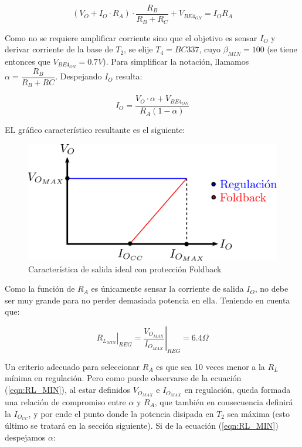 $$(V_O + I_O \cdot R_A)\cdot \frac{R_B}{R_B+R_C} + V_{BE4_{ON}} = I_OR_A$$

Como no se requiere amplificar corriente sino que el objetivo es sensar $I_O$ y derivar corriente de la base de $T_2$, se elije $T_4 = BC337$, cuyo $\beta_{MIN} = 100$ (se tiene entonces que $V_{BE4_{ON}} = 0.7V$). Para simplificar la notaci\'on, llamamos $\alpha = \dfrac{R_B}{R_B+RC}$. Despejando $I_O$ resulta:

\begin{equation}
I_O = \frac{V_O \cdot \alpha + V_{BE4_{ON}}}{R_A(1-\alpha)}
\label{eqn:io_fb}
\end{equation}

EL gr\'afico caracter\'istico resultante es el siguiente:

\begin{figure}[!h]
\begin{centering}
\includegraphics[scale=0.5]{Imagenes/FB_Generico.png}
\par\end{centering}
\caption{Caracter\'istica de salida ideal con protecci\'on Foldback}

\end{figure}

Como la funci\'on de $R_A$ es \'unicamente sensar la corriente de salida $I_O$, no debe ser muy grande para no perder demasiada potencia en ella. Teniendo en cuenta que:

\begin{equation}
\left. R_{L_{MIN}} \right|_{REG} = \left. \frac{V_{O_{MAX}}}{I_{O_{MAX}}} \right|_{REG} = 6.4\Omega
\label{eqn:RL_MIN}
\end{equation}

Un criterio adecuado para seleccionar $R_A$ es que sea 10 veces menor a la $R_L$ m\'inima en regulaci\'on. Pero como puede observarse de la ecuaci\'on (\ref{eqn:RL_MIN}), al estar definidos $V_{O_{MAX}}$ e $I_{O_{MAX}}$ en regulaci\'on, queda formada una relaci\'on de compromiso entre $\alpha$ y $R_A$, que tambi\'en en consecuencia definir\'a la $I_{O_{CC}}$, y por ende el punto donde la potencia disipada en $T_2$ sea m\'axima (esto \'ultimo se tratar\'a en la secci\'on siguiente). Si de la ecuaci\'on (\ref{eqn:RL_MIN}) despejamos $\alpha$:

